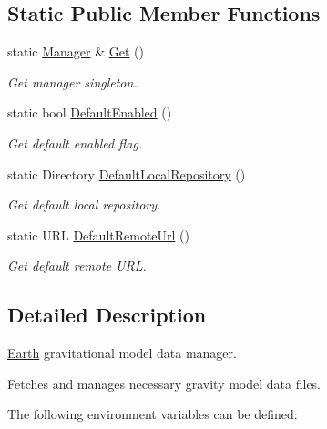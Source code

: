\subsection*{Static Public Member Functions}
\begin{DoxyCompactItemize}
\item 
static \hyperlink{classostk_1_1physics_1_1environment_1_1gravitational_1_1earth_1_1_manager}{Manager} \& \hyperlink{classostk_1_1physics_1_1environment_1_1gravitational_1_1earth_1_1_manager_a8665dccf68085ce30fb0afcd8d6c71a3}{Get} ()
\begin{DoxyCompactList}\small\item\em Get manager singleton. \end{DoxyCompactList}\item 
static bool \hyperlink{classostk_1_1physics_1_1environment_1_1gravitational_1_1earth_1_1_manager_a2f515eaf38d65e922ecbdfeea6c54fc3}{Default\+Enabled} ()
\begin{DoxyCompactList}\small\item\em Get default enabled flag. \end{DoxyCompactList}\item 
static Directory \hyperlink{classostk_1_1physics_1_1environment_1_1gravitational_1_1earth_1_1_manager_affbe1673e70ab9ad31e22982483f2fce}{Default\+Local\+Repository} ()
\begin{DoxyCompactList}\small\item\em Get default local repository. \end{DoxyCompactList}\item 
static U\+RL \hyperlink{classostk_1_1physics_1_1environment_1_1gravitational_1_1earth_1_1_manager_aa5a7e062dba707faaf9da092e011f23d}{Default\+Remote\+Url} ()
\begin{DoxyCompactList}\small\item\em Get default remote U\+RL. \end{DoxyCompactList}\end{DoxyCompactItemize}


\subsection{Detailed Description}
\hyperlink{classostk_1_1physics_1_1environment_1_1gravitational_1_1_earth}{Earth} gravitational model data manager. 

Fetches and manages necessary gravity model data files.

The following environment variables can be defined\+:


